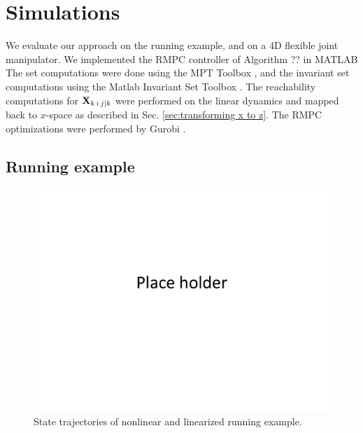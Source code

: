 \section{Simulations}
\label{sec:simulations}

We evaluate our approach on the running example, and on a 4D flexible joint manipulator.
We implemented the RMPC controller of Algorithm ?? in MATLAB
The set computations were done using the MPT Toolbox \cite{MPT3}, and the invariant set computations using the Matlab Invariant Set Toolbox \cite{IST}. 
The reachability computations for $\mathbf{X}_{k+j|k}$ were performed on the linear dynamics and mapped back to $x$-space as described in Sec. \ref{sec:transforming x to z}.
The RMPC optimizations were performed by Gurobi \cite{gurobi}.

\subsection{Running example}

\begin{figure}
	\centering	
	\includegraphics[scale=0.2]{figs/placeHolder.pdf}
	\caption{State trajectories of nonlinear and linearized running example.}
	\label{fig:state linear nonlinear toy}
\end{figure}

